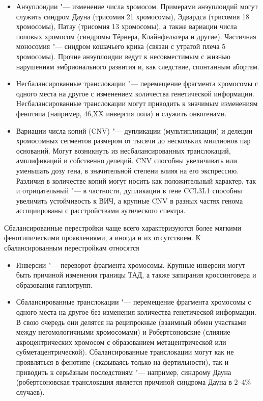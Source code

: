 \documentclass[a4paper,12pt]{article}
\begin{document}
\begin{itemize}
\item Анэуплоидии "--- изменение числа хромосом.
Примерами анэуплоидий могут служить синдром Дауна (трисомия 21 хромосомы), Эдвардса (трисомия 18 хромосомы), Патау (трисомия 13 хромосомы), а также вариации числа половых хромосом (синдромы Тёрнера, Клайнфельтера и другие).
Частичная моносомия "--- синдром кошачьего крика (связан с утратой плеча 5 хромосомы).
Прочие анэуплоидии ведут к несовместимым с жизнью нарушениям эмбрионального развития и, как следствие, спонтанным абортам.
\item Несбалансированные транслокации "--- перемещение фрагмента хромосомы с одного места на другое с изменением количества генетической информации.
Несбалансированные транслокации могут приводить к значимым изменениям фенотипа (например, 46,XX инверсия пола\cite{Rizvi_2008}) и служить онкогенами\cite{o-connor}.
\item Вариации числа копий (CNV) "--- дупликации (мультипликации) и делеции хромосомных сегментов размером от тысячи до нескольких миллионов пар оснований.
Могут возникнуть из несбалансированных транслокаций, амплификаций и собственно делеций.
CNV способны увеличивать или уменьшать дозу гена, в значительной степени влияя на его экспрессию.
Различия в количестве копий могут носить как положительный характер, так и отрицательный "--- в частности, дупликации в гене CCL3L1 способны увеличить устойчивость к ВИЧ\cite{Gonzalez_2005}, а крупные CNV в разных частях генома ассоциированы с расстройствами аутического спектра\cite{Sebat_2007}.
\end{itemize}

Сбалансированные перестройки чаще всего характеризуются более мягкими фенотипическими проявлениями, а иногда и их отсутствием.
К сбалансированным перестройкам относятся

\begin{itemize}
\item Инверсии "--- переворот фрагмента хромосомы.
Крупные инверсии могут быть причиной изменения границы ТАД, а также запирания кроссинговера и образования гаплогрупп.
\item Сбалансированные транслокации "--- перемещение фрагмента хромосомы с одного места на другое без изменения количества генетической информации.
В свою очередь они делятся на реципрокные (взаимный обмен участками между негомологичными хромосомами) и Робертсоновские (слияние акроцентрических хромосом с образованием метацентрической или субметацентрической).
Сбалансированные транслокации могут как не проявляться в фенотипе (сказываясь только на фертильности\cite{Dong_2012}), так и приводить к серьёзным последствиям "--- например, синдрому Дауна (робертсоновская транслокация является причиной синдрома Дауна в 2--4\% случаев\cite{Asim_2015}).
\end{itemize}
\end{document}
